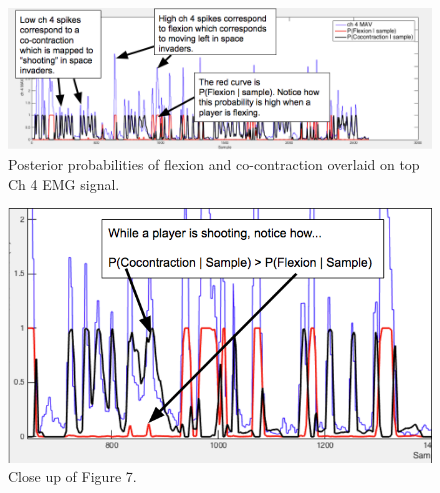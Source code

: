 \documentclass[times, 10pt,twocolumn]{article}
\begin{document}
\begin{figure}
  \includegraphics[width=\linewidth]{Figures/f7.png}
  \caption{Posterior probabilities of flexion and co-contraction overlaid on top Ch 4 EMG signal.}
  \label{fig:posterior_probabilities}
\end{figure}

\begin{figure}
  \includegraphics[width=\linewidth]{Figures/f8.png}
  \caption{Close up of Figure 7.}
  \label{fig:posterior_probabilities_close_up}
\end{figure}
\end{document}
